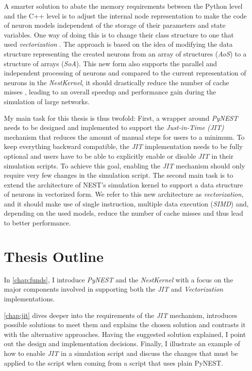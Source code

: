 A smarter solution to abate the memory requirements between the Python level and the C++ level is to adjust the internal node representation to make the code of neuron models independent of the storage of their parameters and state variables. One way of doing this is to change their class structure to one that used \emph{vectorization} \citep{nuzman2006auto}. The approach is based on the idea of modifying the data structure representing the created neurons from an array of structures (\emph{AoS}) to a structure of arrays (\emph{SoA}). This new form also supports the parallel and independent processing of neurons and compared to the current representation of neurons in the \emph{NestKernel}, it should drastically reduce the number of cache misses \citep{ghosh1997cache}, leading to an overall speedup and performance gain during the simulation of large networks.

My main task for this thesis is thus twofold: First, a wrapper around \emph{PyNEST} needs to be designed and implemented to support the \emph{Just-in-Time (JIT)} mechanism that reduces the amount of manual steps for users to a minimum. To keep everything backward compatible, the \emph{JIT} implementation needs to be fully optional and users have to be able to explicitly enable or disable \emph{JIT} in their simulation scripts. To achieve this goal, enabling the \emph{JIT} mechanism should only require very few changes in the simulation script. The second main task is to extend the architecture of NEST's simulation kernel to support a data structure of neurons in vectorized form. We refer to this new architecture as \emph{vectorization}, and it should make use of single instruction, multiple data execution (\emph{SIMD}) and, depending on the used models, reduce the number of cache misses and thus lead to better performance.

\section{Thesis Outline}

In \autoref{chap:funds}, I introduce \emph{PyNEST} and the \emph{NestKernel} with a focus on the major components involved in supporting both the \emph{JIT} and \emph{Vectorization} implementations.

\autoref{chap:jit} dives deeper into the requirements of the \emph{JIT} mechanism, introduces possible solutions to meet them and explains the chosen solution and contrasts it with the alternative approaches. Having the suggested solution explained, I point out the design and implementation decisions. Finally, I illustrate an example of how to enable \emph{JIT} in a simulation script and discuss the changes that must be applied to the script when coming from a script that uses plain PyNEST.

